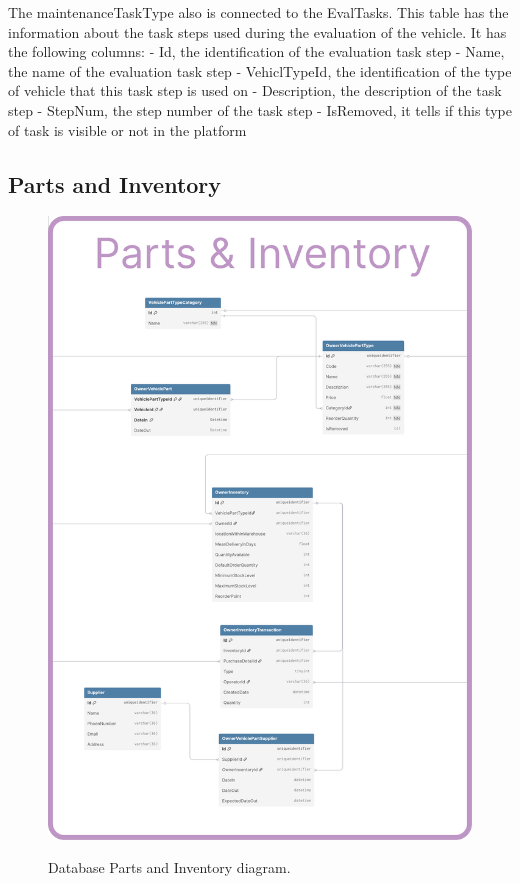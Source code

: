 The maintenanceTaskType also is connected to the EvalTasks. This table has the information about the task steps used during the evaluation of the vehicle.
It has the following columns:
- Id, the identification of the evaluation task step
- Name, the name of the evaluation task step
- VehiclTypeId, the identification of the type of vehicle that this task step is used on
- Description, the description of the task step
- StepNum, the step number of the task step
- IsRemoved, it tells if this type of task is visible or not in the platform


\subsection{Parts and Inventory} 


\begin{figure}[h]
  \caption{Database Parts and Inventory diagram.}
  \centering
  \includegraphics[width=\textwidth]{figs/dbDiagrams/Parts_and_Inventory}
  \label{fig:figure2}
\end{figure}

